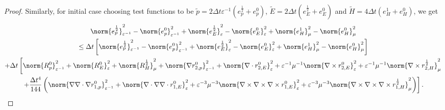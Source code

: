 \documentclass{amsart}
\theoremstyle{thmstyleone}%
\theoremstyle{thmstyletwo}%
\theoremstyle{thmstylethree}%
\begin{document}
\begin{proof}
Similarly, for initial case choosing test functions to be $\widetilde{p} = 2 \Delta t \varepsilon^{-1} \left( e_p^\frac{1}{2} + e_p^0 \right)$, $\widetilde{E} = 2 \Delta t \left( e_E^\frac{1}{2}  + e_E^0 \right)$ and $\widetilde{H} = 4 \Delta t \left( e_H^1 + e_H^0 \right)$, we get
\begin{multline*}
  \norm{e_p^{\frac{1}{2}}}^2_{\varepsilon^{-1}} - \norm{e_p^0}^2_{\varepsilon^{-1}} + \norm{e_E^{\frac{1}{2}}}^2_{\varepsilon} - \norm{e_E^0}^2_{\varepsilon} + \norm{e_H^{1}}^2_{\mu} -  \norm{e_H^0}^2_{\mu} \\ \le \Delta t \left[   \norm{e_p^{\frac{1}{2}}}^2_{\varepsilon^{-1}} - \norm{e_p^0}^2_{\varepsilon^{-1}} + \norm{e_E^{\frac{1}{2}}}^2_{\varepsilon} - \norm{e_E^0}^2_{\varepsilon} + \norm{e_H^{1}}^2_{\mu} -  \norm{e_H^0}^2_{\mu} \right] \\ +
 \Delta t \left[ \norm{R_p^0}^2_{\varepsilon^{-1}} + \norm{R_E^0}^2_{\varepsilon} + \norm{R_H^{\frac{1}{2}}}^2_{\mu} + \norm{\nabla r_{2,p}^0} ^2_{\varepsilon^{-1}} + \norm{\nabla \cdot r_{2,E}^0}^2_{\varepsilon} + \varepsilon^{-1} \mu^{-1} \norm{\nabla \times r_{2,E}^0}^2_{\varepsilon} +  \varepsilon^{-1} \mu^{-1} \norm{\nabla \times r_{2,H}^{\frac{1}{2}}}^2_{\mu} \right. \\ 
\left. + \dfrac{\Delta t^4}{144} \left( \norm{\nabla \nabla \cdot \nabla r_{1,p}^0} ^2_{\varepsilon^{-1}} + \norm{\nabla \cdot \nabla \nabla \cdot r_{1,E}^0}^2_{\varepsilon} + \varepsilon^{-3} \mu^{-3} \norm{\nabla \times \nabla \times \nabla \times r_{1,E}^0}^2_{\varepsilon} +  \varepsilon^{-3} \mu^{-3} \norm{\nabla \times \nabla \times \nabla \times r_{1,H}^{\frac{1}{2}}}^2_{\mu} \right) \right].
\end{multline*}


\end{proof}
\end{document}

